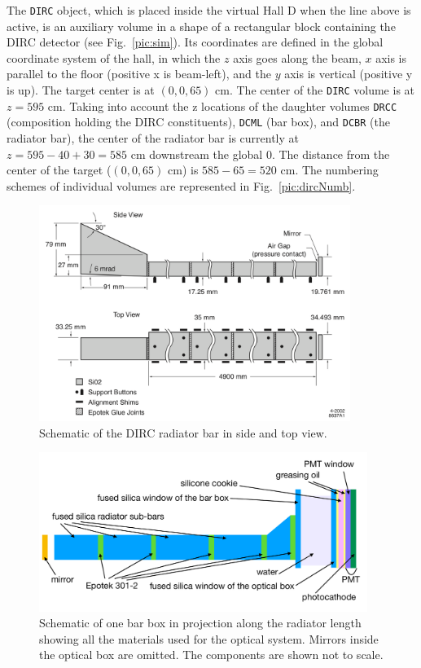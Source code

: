 The \texttt{DIRC} object, which is placed inside the virtual Hall D when the line above is active, is an auxiliary volume in a shape of a rectangular block containing the DIRC detector (see Fig.~\ref{pic:sim}). Its coordinates are defined in the global coordinate system of the hall, in which the $z$ axis goes along the beam, $x$ axis is parallel to the floor (positive x is beam-left), and the $y$ axis is vertical (positive y is up). The target center is at $(0, 0, 65)$ cm. The center of the \texttt{DIRC} volume is at $z = 595$ cm.
Taking into account the z locations of the daughter volumes \texttt{DRCC} (composition holding the DIRC constituents), \texttt{DCML} (bar box), and \texttt{DCBR} (the radiator bar), the center of the radiator bar is currently at $z = 595 - 40 + 30 =585$ cm downstream the global 0. The distance from the center of the target ($(0, 0, 65)$ cm) is $585 - 65 = 520$ cm. The numbering schemes of individual volumes are represented in Fig.~\ref{pic:dircNumb}.

\begin{figure}[!htb]
\centering
\includegraphics[width=0.9\textwidth]{pics/bars.png}
\caption{\label{pic:bar}
Schematic of the DIRC radiator bar in side and top view.
}
\end{figure} 

\begin{figure}[!h]
\centering
\includegraphics[angle=0,width=0.95\textwidth]{pics/struct3.pdf}
\caption{\label{pic:struct}
Schematic of one bar box in projection along the radiator length showing all the materials used for the optical system. Mirrors inside the optical box are omitted. The components are shown not to scale.
}
\end{figure}

